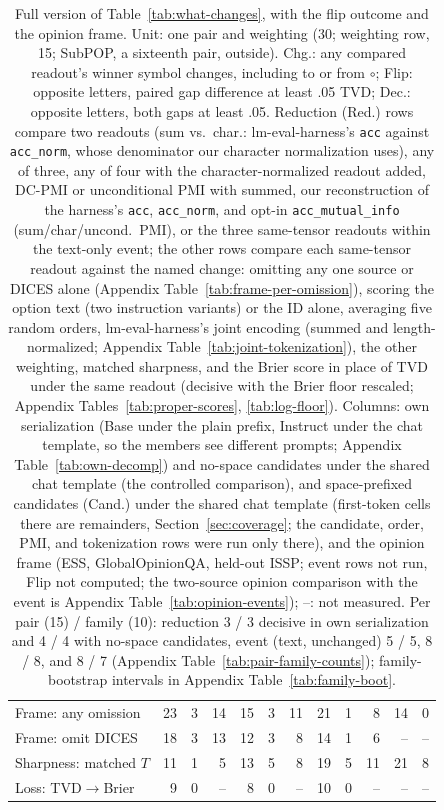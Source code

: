\begin{table}[t]
\begin{tabular}{@{}lrrrrrrrrrrr@{}}
Frame: any omission & 23 & 3 & 14 & 15 & 3 & 11 & 21 & 1 & 8 & 14 & 0 \\
Frame: omit DICES & 18 & 3 & 13 & 12 & 3 & 8 & 14 & 1 & 6 & -- & -- \\
Sharpness: matched $T$ & 11 & 1 & 5 & 13 & 5 & 8 & 19 & 5 & 11 & 21 & 8 \\
Loss: TVD$\to$Brier & 9 & 0 & -- & 8 & 0 & -- & 10 & 0 & -- & -- & -- \\
\bottomrule
\end{tabular}
\caption{Full version of Table~\ref{tab:what-changes}, with the flip outcome and the opinion frame. Unit: one pair and weighting (30; weighting row, 15; SubPOP, a sixteenth pair, outside). Chg.: any compared readout's winner symbol changes, including to or from $\circ$; Flip: opposite letters, paired gap difference at least .05 TVD; Dec.: opposite letters, both gaps at least .05. Reduction (Red.) rows compare two readouts (sum vs.\ char.: lm-eval-harness's \texttt{acc} against \texttt{acc\_norm}, whose denominator our character normalization uses), any of three, any of four with the character-normalized readout added, DC-PMI or unconditional PMI with summed, our reconstruction of the harness's \texttt{acc}, \texttt{acc\_norm}, and opt-in \texttt{acc\_mutual\_info} (sum/char/uncond.\ PMI), or the three same-tensor readouts within the text-only event; the other rows compare each same-tensor readout against the named change: omitting any one source or DICES alone (Appendix Table~\ref{tab:frame-per-omission}), scoring the option text (two instruction variants) or the ID alone, averaging five random orders, lm-eval-harness's joint encoding (summed and length-normalized; Appendix Table~\ref{tab:joint-tokenization}), the other weighting, matched sharpness, and the Brier score in place of TVD under the same readout (decisive with the Brier floor rescaled; Appendix Tables~\ref{tab:proper-scores}, \ref{tab:log-floor}). Columns: own serialization (Base under the plain prefix, Instruct under the chat template, so the members see different prompts; Appendix Table~\ref{tab:own-decomp}) and no-space candidates under the shared chat template (the controlled comparison), and space-prefixed candidates (Cand.) under the shared chat template (first-token cells there are remainders, Section~\ref{sec:coverage}; the candidate, order, PMI, and tokenization rows were run only there), and the opinion frame (ESS, GlobalOpinionQA, held-out ISSP; event rows not run, Flip not computed; the two-source opinion comparison with the event is Appendix Table~\ref{tab:opinion-events}); --: not measured. Per pair (15) / family (10): reduction 3 / 3 decisive in own serialization and 4 / 4 with no-space candidates, event (text, unchanged) 5 / 5, 8 / 8, and 8 / 7 (Appendix Table~\ref{tab:pair-family-counts}); family-bootstrap intervals in Appendix Table~\ref{tab:family-boot}.}
\label{tab:what-changes-full}
\end{table}
